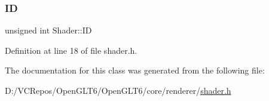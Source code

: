 \subsubsection{\texorpdfstring{ID}{ID}}
{\footnotesize\ttfamily unsigned int Shader\+::\+ID}



Definition at line 18 of file shader.\+h.



The documentation for this class was generated from the following file\+:\begin{DoxyCompactItemize}
\item 
D\+:/\+V\+C\+Repos/\+Open\+G\+L\+T6/\+Open\+G\+L\+T6/core/renderer/\mbox{\hyperlink{shader_8h}{shader.\+h}}\end{DoxyCompactItemize}
